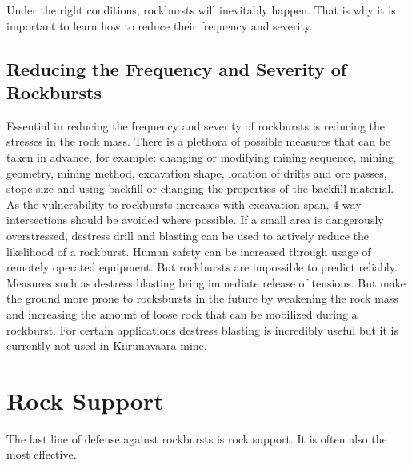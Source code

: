 Under the right conditions, rockbursts will inevitably happen. \autocite[4]{Heal10} That is why it is important to learn how to reduce their frequency and severity.


\section{Reducing the Frequency and Severity of Rockbursts}
Essential in reducing the frequency and severity of rockbursts is reducing the stresses in the rock mass. There is a plethora of possible measures that can be taken in advance, for example: changing or modifying mining sequence, mining geometry, mining method, excavation shape, location of drifts and ore passes, stope size and using backfill or changing the properties of the backfill material. \autocite[219]{Kaiser12} As the vulnerability to rockbursts increases with excavation span, 4-way intersections should be avoided where possible. \autocite[323]{Heal10}
If a small area is dangerously overstressed, destress drill and blasting can be used to actively reduce the likelihood of a rockburst. \autocite[219]{Kaiser12}
Human safety can be increased through usage of remotely operated equipment. \autocite[3]{Heal10}
But rockbursts are impossible to predict reliably. \autocite[4]{Heal10} \autocite[10]{durrheim06} Measures such as destress blasting bring immediate release of tensions. But make the ground more prone to rocksbursts in the future by weakening the rock mass and increasing the amount of loose rock that can be mobilized during a rockburst. \autocite[61]{Brauner94} For certain applications destress blasting is incredibly useful but it is currently not used in Kiirunavaara mine.

\chapter{Rock Support}
The last line of defense against rockbursts is rock support. It is often also the most effective. \autocite[323]{Heal10}


